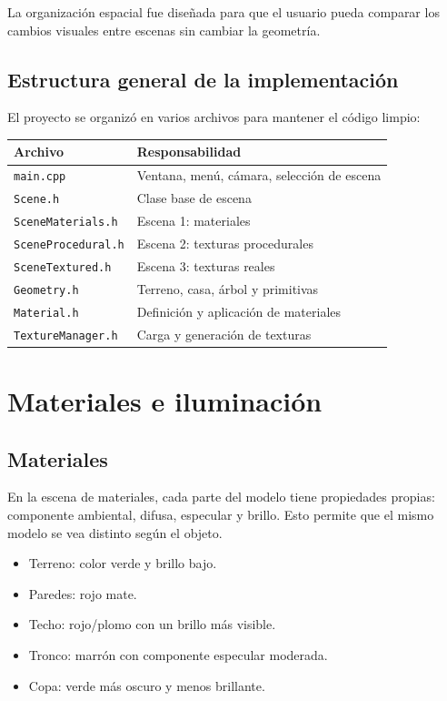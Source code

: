 \documentclass[12pt,a4paper]{article}
\begin{document}
La organización espacial fue diseñada para que el usuario pueda comparar los
cambios visuales entre escenas sin cambiar la geometría.

\subsection{Estructura general de la implementación}

El proyecto se organizó en varios archivos para mantener el código limpio:

\begin{center}
\begin{tabular}{ll}
\toprule
\textbf{Archivo} & \textbf{Responsabilidad} \\
\midrule
\texttt{main.cpp} & Ventana, menú, cámara, selección de escena \\
\texttt{Scene.h} & Clase base de escena \\
\texttt{SceneMaterials.h} & Escena 1: materiales \\
\texttt{SceneProcedural.h} & Escena 2: texturas procedurales \\
\texttt{SceneTextured.h} & Escena 3: texturas reales \\
\texttt{Geometry.h} & Terreno, casa, árbol y primitivas \\
\texttt{Material.h} & Definición y aplicación de materiales \\
\texttt{TextureManager.h} & Carga y generación de texturas \\
\bottomrule
\end{tabular}
\end{center}

\section{Materiales e iluminación}

\subsection{Materiales}

En la escena de materiales, cada parte del modelo tiene propiedades propias:
componente ambiental, difusa, especular y brillo. Esto permite que el mismo
modelo se vea distinto según el objeto.

\begin{itemize}[noitemsep]
  \item Terreno: color verde y brillo bajo.
  \item Paredes: rojo mate.
  \item Techo: rojo/plomo con un brillo más visible.
  \item Tronco: marrón con componente especular moderada.
  \item Copa: verde más oscuro y menos brillante.
\end{itemize}
\end{document}
